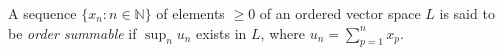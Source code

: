 A sequence $\{x_n: n \in \mathbb{N}\}$ of elements $\geq 0$ of an ordered vector space $L$ is said to be \textit{order summable} if $\sup_n u_n$ exists in $L$, where $u_n = \sum_{p=1}^{n} x_p$.
